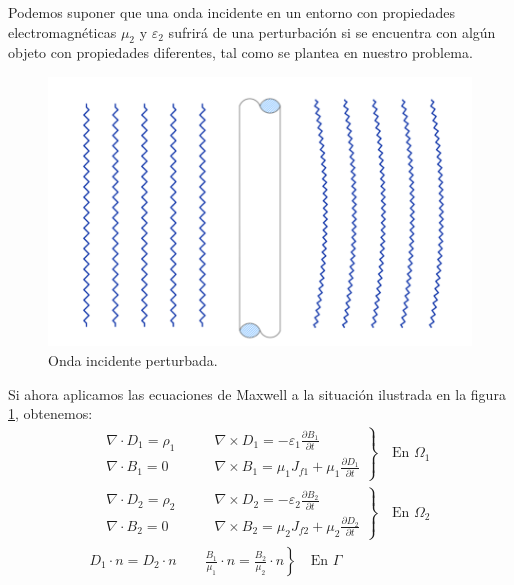\documentclass[11pt]{article}
\begin{document}
\newpage
Podemos suponer que una onda incidente en un entorno con propiedades electromagnéticas $\mu_2$ y $\varepsilon_2$ sufrirá de una perturbación si se encuentra con algún objeto con propiedades diferentes, tal como se plantea en nuestro problema.
\begin{figure}[H]
\centering
\includegraphics[width=16cm]{Imagenes/ondaincidente3.png}
\caption{Onda incidente perturbada.}\label{fig:Onda perturbada}
\end{figure}
Si ahora aplicamos las ecuaciones de Maxwell a la situación ilustrada en la figura \ref{fig:Onda perturbada}, obtenemos:
\begin{equation}
\label{eq:Onda perturbada}
\begin{split}
\left.
\begin{aligned}
&\nabla\cdot D_1 = \rho_1\qquad & \nabla\times D_1 = -\varepsilon_1\frac{\partial B_1}{\partial t}\\
&\nabla\cdot B_1 = 0\qquad & \nabla\times B_1 = \mu_1 J_{f1}+\mu_1\frac{\partial D_1}{\partial t}
\end{aligned}
\right\}
\quad\text{En }\Omega_1\\
\left.
\begin{aligned}
&\nabla\cdot D_2 = \rho_2\qquad & \nabla\times D_2 = -\varepsilon_2\frac{\partial B_2}{\partial t}\\
&\nabla\cdot B_2 = 0\qquad & \nabla\times B_2 = \mu_2 J_{f2}+\mu_2\frac{\partial D_2}{\partial t}
\end{aligned}
\right\}
\quad\text{En }\Omega_2\\
\left. 
D_1\cdot n=D_2\cdot n \qquad \frac{B_1}{\mu_1}\cdot n=\frac{B_2}{\mu_2}\cdot n
\right\}
\quad\text{En }\Gamma\\
\end{split}
\end{equation}
\end{document}
